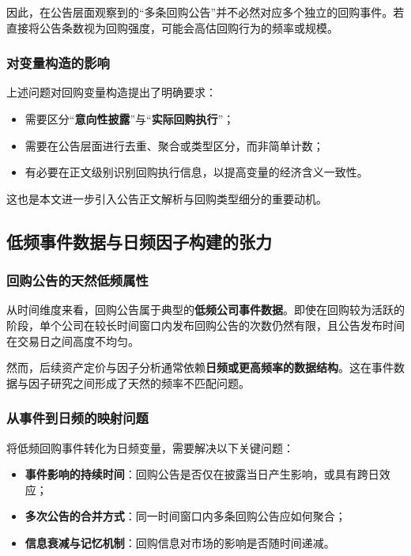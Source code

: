 \documentclass[a4paper,10pt]{article}
\begin{document}
因此，在公告层面观察到的“多条回购公告”并不必然对应多个独立的回购事件。若直接将公告条数视为回购强度，可能会高估回购行为的频率或规模。

\subsubsection{对变量构造的影响}

上述问题对回购变量构造提出了明确要求：

\begin{itemize}
    \item 需要区分“\textbf{意向性披露}”与“\textbf{实际回购执行}”；
    \item 需要在公告层面进行去重、聚合或类型区分，而非简单计数；
    \item 有必要在正文级别识别回购执行信息，以提高变量的经济含义一致性。
\end{itemize}

这也是本文进一步引入公告正文解析与回购类型细分的重要动机。

\subsection{低频事件数据与日频因子构建的张力}

\subsubsection{回购公告的天然低频属性}

从时间维度来看，回购公告属于典型的\textbf{低频公司事件数据}。即使在回购较为活跃的阶段，单个公司在较长时间窗口内发布回购公告的次数仍然有限，且公告发布时间在交易日之间高度不均匀。

然而，后续资产定价与因子分析通常依赖\textbf{日频或更高频率的数据结构}。这在事件数据与因子研究之间形成了天然的频率不匹配问题。

\subsubsection{从事件到日频的映射问题}

将低频回购事件转化为日频变量，需要解决以下关键问题：

\begin{itemize}
    \item \textbf{事件影响的持续时间}：回购公告是否仅在披露当日产生影响，或具有跨日效应；
    \item \textbf{多次公告的合并方式}：同一时间窗口内多条回购公告应如何聚合；
    \item \textbf{信息衰减与记忆机制}：回购信息对市场的影响是否随时间递减。
\end{itemize}
\end{document}
